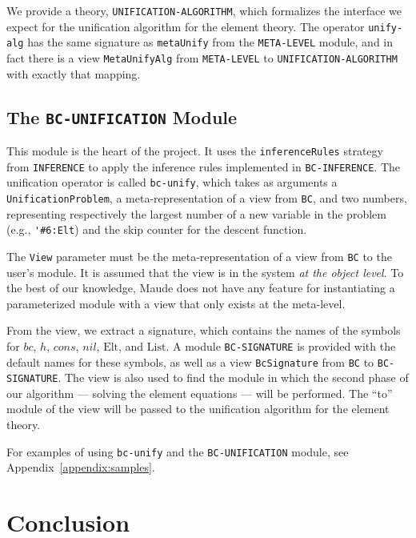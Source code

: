 \documentclass[11pt]{article}
\newcommand{\Elt}{\mathrm{Elt}}
\newcommand{\List}{\mathrm{List}}
\newcommand{\Bc}{\mathit{bc}}
\newcommand{\Hh}{\mathit{h}}
\newcommand{\Cons}{\mathit{cons}}
\newcommand{\Nil}{\mathit{nil}}
\newcommand{\TitleListing}[1]{\texorpdfstring{\lstinline|#1|}{#1}}
\begin{document}
We provide a theory, \lstinline|UNIFICATION-ALGORITHM|, which formalizes the
interface we expect for the unification algorithm for the element theory. The
operator \lstinline|unify-alg| has the same signature as \lstinline|metaUnify|
from the \lstinline|META-LEVEL| module, and in fact there is a view
\lstinline|MetaUnifyAlg| from \lstinline|META-LEVEL| to
\lstinline|UNIFICATION-ALGORITHM| with exactly that mapping.

\subsection{The \TitleListing{BC-UNIFICATION} Module}
\label{subsection:bc-unif-mod}

This module is the heart of the project. It uses the \lstinline|inferenceRules|
strategy from \lstinline|INFERENCE| to apply the inference rules implemented
in \lstinline|BC-INFERENCE|. The unification operator is called
\lstinline|bc-unify|, which takes as arguments a
\lstinline|UnificationProblem|, a meta-representation of a view from
\lstinline|BC|, and two numbers, representing respectively the largest number
of a new variable in the problem (e.g., \lstinline|'#6:Elt|) and the skip
counter for the descent function.

The \lstinline|View| parameter must be the meta-representation of a view from
\lstinline|BC| to the user's module. It is assumed that the view is in the
system \emph{at the object level}. To the best of our knowledge, Maude does not
have any feature for instantiating a parameterized module with a view that only
exists at the meta-level.

From the view, we extract a signature, which contains the names of the symbols
for $\Bc$, $\Hh$, $\Cons$, $\Nil$, $\Elt$, and $\List$. A module
\lstinline|BC-SIGNATURE| is provided with the default names for these symbols, as
well as a view \lstinline|BcSignature| from \lstinline|BC| to
\lstinline|BC-SIGNATURE|. The view is also used to find the module in which
the second phase of our algorithm --- solving the element equations --- will be
performed. The ``to'' module of the view will be passed to the unification
algorithm for the element theory.

For examples of using \lstinline|bc-unify| and the \lstinline|BC-UNIFICATION|
module, see Appendix~\ref{appendix:samples}.

\section{Conclusion}\label{section:conclusion}
\end{document}
